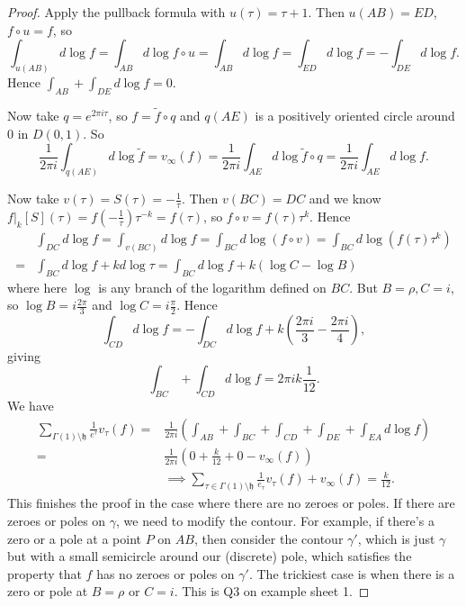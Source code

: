 \documentclass{article}
\theoremstyle{definition}
\begin{document}
\begin{proof}
    Apply the pullback formula with $u(\tau) = \tau+1$. Then $u(AB) = ED$, $f \circ u = f$, so $$\int_{u(AB)}^{} d \log f = \int_{AB}^{} d \log f \circ u = \int_{AB}^{} d \log f = \int_{ED}^{} d \log f = - \int_{DE}^{} d \log f.$$
    Hence $\int_{AB}^{} + \int_{DE}^{} d \log f = 0$.
    \vspace{1mm}
     
    Now take $q = e^{2\pi i \tau}$, so $f = \tilde{f} \circ q$ and $q(AE)$ is a positively oriented circle around 0 in $D(0,1)$. So $$\frac{1}{2\pi i} \int_{q(AE)}^{} d \log \tilde{f} = v_{\infty}(f) = \frac{1}{2\pi i} \int_{AE}^{} d \log \tilde{f} \circ q = \frac{1}{2\pi i}\int_{AE}^{} d \log f.$$ 
    \vspace{1mm}
     
    Now take $v(\tau) = S(\tau) = -\frac{1}{\tau}$. Then $v(BC) = DC$ and we know $f|_k[S](\tau) = f\left(-\frac{1}{\tau}\right)\tau^{-k} = f(\tau)$, so $f \circ v = f(\tau)\tau^k$. Hence 
    \begin{align*}
        &\int_{DC}^{} d \log f = \int_{v(BC)}^{} d \log f = \int_{BC}^{} d \log (f \circ v) = \int_{BC}^{} d \log(f(\tau)\tau^k) \\ =& \int_{BC}^{} d \log f + k d \log \tau = \int_{BC}^{} d \log f + k(\log C - \log B)
    \end{align*}
    where here $\log$ is any branch of the logarithm defined on $BC$. But $B = \rho, C = i$, so $\log B = i \frac{2\pi}{3}$ and $\log C = i \frac{\pi}{2}$. Hence \[
    \int_{CD}^{} d \log f = - \int_{DC}^{} d \log f + k\left(\frac{2\pi i }{3} - \frac{2 \pi i }{4}\right),
    \]
    giving \[
    \int_{BC}^{} +\int_{CD}^{} d \log f = 2\pi i k \frac{1}{12}.
    \]
    We have 
    \begin{align*}
        \sum_{\Gamma(1)\setminus \mathfrak{h}}^{} \frac{1}{e^{\tau}} v_\tau(f) =& \frac{1}{2\pi i } \left(\int_{AB}^{} +\int_{BC}^{} +\int_{CD}^{} +\int_{DE}^{} +\int_{EA}^{} d \log f \right) \\
        =& \frac{1}{2\pi i} \left( 0 + \frac{k}{12} + 0 - v_{\infty}(f) \right) \\
        &\implies \sum_{ \tau \in \Gamma(1)\setminus \mathfrak{h}}^{} \frac{1}{e_{\tau}}v_\tau(f) + v_\infty(f) = \frac{k}{12}.
    \end{align*}
    This finishes the proof in the case where there are no zeroes or poles. If there are zeroes or poles on $\gamma$, we need to modify the contour. For example, if there's a zero or a pole at a point $P$ on $AB$, then consider the contour $\gamma'$, which is just $\gamma$ but with a small semicircle around our (discrete) pole, which satisfies the property that $f$ has no zeroes or poles on $\gamma'$. The trickiest case is when there is a zero or pole at $B = \rho$ or $C = i$. This is Q3 on example sheet 1. 
\end{proof}
\end{document}
